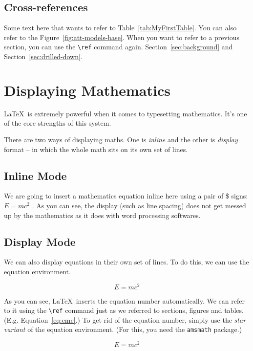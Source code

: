 \documentclass[twocolumn]{article}
\begin{document}
\subsection{Cross-references} 
Some text here that wants to refer to Table~\ref{tab:MyFirstTable}. You can also refer to the Figure~\ref{fig:att-models-base}. When you want to refer to a previous section, you can use the \verb|\ref| command again. Section~\ref{sec:background} and Section~\ref{sec:drilled-down}. 

 


\section{Displaying Mathematics}

\LaTeX\ is extremely powerful when it comes to typesetting mathematics. It's one of the core strengths of this system. 

There are two ways of displaying maths. One is \emph{inline} and the other is \emph{display} format -- in which the whole math sits on its own set of lines.


\subsection{Inline Mode}
We are going to insert a mathematics equation inline here using a pair of \$ signs: $E=mc^2$   . As you can see, the display (such as line spacing) does not get messed up by the mathematics as it does with word processing softwares. 

\subsection{Display Mode}
We can also display equations in their own set of lines. To do this, we can use the equation environment. 

\begin{equation}\label{eq:emc}
E=mc^2
\end{equation}

As you can see, \LaTeX\ inserts the equation number automatically. We can refer to it using the \verb|\ref| command just as we referred to sections, figures and tables. (E.g. Equation~\ref{eq:emc}.) To get rid of the equation number, simply use the \emph{star variant} of the equation environment. (For this, you need the \texttt{amsmath} package.)

\begin{equation*}
E=mc^2
\end{equation*}
\end{document}
